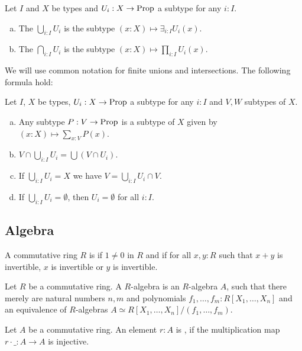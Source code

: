 \begin{definition}
  Let $I$ and $X$ be types and $U_i:X\to\mathrm{Prop}$ a subtype for any $i:I$.
  \begin{enumerate}[(a)]
  \item The  $\bigcup_{i:I}U_i$ is the subtype $(x:X)\mapsto \exists_{i:I}U_i(x)$.
  \item The  $\bigcap_{i:I}U_i$ is the subtype $(x:X)\mapsto\prod_{i:I}U_i(x)$.
  \end{enumerate}
\end{definition}

We will use common notation for finite unions and intersections.
The following formula hold:

\begin{lemma}
  Let $I$, $X$ be types, $U_i:X\to\mathrm{Prop}$ a subtype for any $i:I$ and $V,W$ subtypes of $X$.
  \begin{enumerate}[(a)]
  \item Any subtype $P:V\to\mathrm{Prop}$ is a subtype of $X$ given by $(x:X)\mapsto\sum_{x:V}P(x)$.
  \item $V\cap \bigcup_{i:I} U_i=\bigcup (V\cap U_i)$.
  \item If $\bigcup_{i:I}U_i=X$ we have $V=\bigcup_{i:I}U_i\cap V$.
  \item If $\bigcup_{i:I}U_i=\emptyset$, then $U_i=\emptyset$ for all $i:I$.
  \end{enumerate}
\end{lemma}

\subsection{Algebra}

\begin{definition}%
  A commutative ring $R$ is  if $1\neq 0$ in $R$ and
  if for all $x,y:R$ such that $x+y$ is invertible, $x$ is invertible or $y$ is invertible.
\end{definition}

\begin{definition}%
  Let $R$ be a commutative ring.
  A  $R$-algebra is an $R$-algebra $A$,
  such that there merely are natural numbers $n,m$ and polynomials $f_1,\dots,f_m:R[X_1,\dots,X_n]$
  and an equivalence of $R$-algebras $A\simeq R[X_1,\dots,X_n]/(f_1,\dots,f_m)$.
\end{definition}

\begin{definition}%
  \label{regular-element}
  Let $A$ be a commutative ring.
  An element $r:A$ is ,
  if the multiplication map $r\cdot\_:A\to A$ is injective.
\end{definition}

